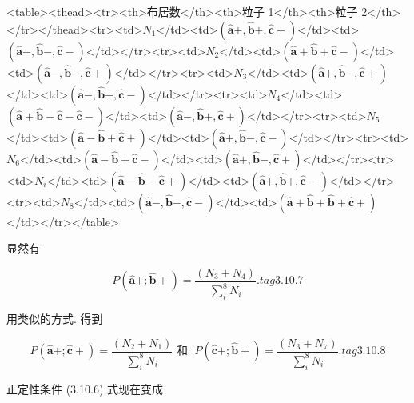 <table><thead><tr><th>布居数</th><th>粒子 1</th><th>粒子 2</th></tr></thead><tr><td>${N}_{1}$</td><td>$\left( {\widehat{\mathbf{a}} + ,\widehat{\mathbf{b}} + ,\widehat{\mathbf{c}} + }\right)$</td><td>$\left( {\widehat{\mathbf{a}}-,\widehat{\mathbf{b}} - ,\widehat{\mathbf{c}} - }\right)$</td></tr><tr><td>${N}_{2}$</td><td>$\left( {\widehat{\mathbf{a}} + \widehat{\mathbf{b}} + \widehat{\mathbf{c}} - }\right)$</td><td>$\left( {\widehat{\mathbf{a}}-,\widehat{\mathbf{b}}-,\widehat{\mathbf{c}} + }\right)$</td></tr><tr><td>${N}_{3}$</td><td>$\left( {\widehat{\mathbf{a}} + ,\widehat{\mathbf{b}} - ,\widehat{\mathbf{c}} + }\right)$</td><td>$\left( {\widehat{\mathbf{a}} - ,\widehat{\mathbf{b}} + ,\widehat{\mathbf{c}} - }\right)$</td></tr><tr><td>${N}_{4}$</td><td>$\left( {\widehat{\mathbf{a}} + \widehat{\mathbf{b}} - \widehat{\mathbf{c}} - \widehat{\mathbf{c}} - }\right)$</td><td>$\left( {\widehat{\mathbf{a}}-,\widehat{\mathbf{b}} + ,\widehat{\mathbf{c}} + }\right)$</td></tr><tr><td>${N}_{5}$</td><td>$\left( {\widehat{\mathbf{a}} - \widehat{\mathbf{b}} + \widehat{\mathbf{c}} + }\right)$</td><td>$\left( {\widehat{\mathbf{a}}+,\widehat{\mathbf{b}}-,\widehat{\mathbf{c}} - }\right)$</td></tr><tr><td>${N}_{6}$</td><td>$\left( {\widehat{\mathbf{a}} - \widehat{\mathbf{b}} + \widehat{\mathbf{c}} - }\right)$</td><td>$\left( {\widehat{\mathbf{a}}+,\widehat{\mathbf{b}} - ,\widehat{\mathbf{c}} + }\right)$</td></tr><tr><td>${N}_{i}$</td><td>$\left( {\widehat{\mathbf{a}} - \widehat{\mathbf{b}} - \widehat{\mathbf{c}} + }\right)$</td><td>$\left( {\widehat{\mathbf{a}} + ,\widehat{\mathbf{b}} + ,\widehat{\mathbf{c}} - }\right)$</td></tr><tr><td>${N}_{8}$</td><td>$\left( {\widehat{\mathbf{a}}-,\widehat{\mathbf{b}}-,\widehat{\mathbf{c}} - }\right)$</td><td>$\left( {\widehat{\mathbf{a}} + \widehat{\mathbf{b}} + \widehat{\mathbf{b}} + \widehat{\mathbf{c}} + }\right)$</td></tr></table>

显然有

$$
P\left( {\widehat{\mathbf{a}}+;\widehat{\mathbf{b}} + }\right) = \frac{\left( {N}_{3} + {N}_{4}\right) }{\mathop{\sum }\limits_{i}^{8}{N}_{i}}. tag{3.10.7}
$$

用类似的方式. 得到

$$
P\left( {\widehat{\mathbf{a}}+;\widehat{\mathbf{c}} + }\right) = \frac{\left( {N}_{2} + {N}_{1}\right) }{\mathop{\sum }\limits_{i}^{8}{N}_{i}}\text{ 和 }\;P\left( {\widehat{\mathbf{c}}+;\widehat{\mathbf{b}} + }\right) = \frac{\left( {N}_{3} + {N}_{7}\right) }{\mathop{\sum }\limits_{i}^{8}{N}_{i}}. tag{3.10.8}
$$

正定性条件 (3.10.6) 式现在变成

